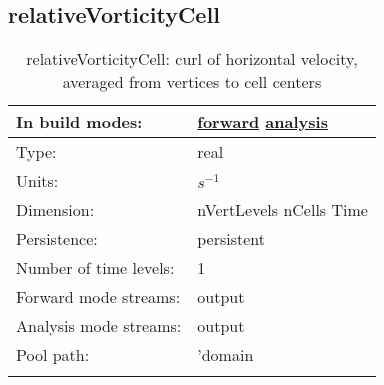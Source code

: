 \subsection[relativeVorticityCell]{relativeVorticityCell}
\label{subsec:var_sec_diagnostics_relativeVorticityCell}
\begin{center}
\begin{longtable}{| p{2.0in} | p{4.0in} |}
        \hline 
        In build modes: & \hyperref[subsec:forward_var_tab_diagnostics]{forward} \hyperref[subsec:analysis_var_tab_diagnostics]{analysis} \\
        \hline 
        Type: & real \\
        \hline 
        Units: & $s^{-1}$ \\
        \hline 
        Dimension: & nVertLevels nCells Time \\
        \hline 
        Persistence: & persistent \\
        \hline 
        Number of time levels: & 1 \\
        \hline 
		 Forward mode streams: &  output \\
        \hline 
		 Analysis mode streams: &  output \\
        \hline 
            Pool path: & 'domain %
 \\
		 \hline 
    \caption{relativeVorticityCell: curl of horizontal velocity, averaged from vertices to cell centers}
\end{longtable}
\end{center}
